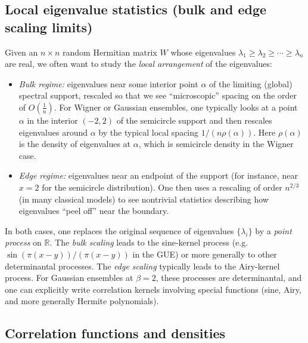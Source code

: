 \documentclass[letterpaper,11pt,oneside,reqno]{article}
\numberwithin{equation}{section}
\theoremstyle{definition}
\begin{document}
\subsection{Local eigenvalue statistics (bulk and edge scaling limits)}
\label{subsec:local-stats-intro}

Given an \(n\times n\) random Hermitian matrix \(W\) whose eigenvalues
\(\lambda_1 \ge \lambda_2 \ge \cdots \ge \lambda_n\) are real,
we often want to study the \emph{local arrangement} of the eigenvalues:
\begin{itemize}
	\item \emph{Bulk regime:}
		eigenvalues near some interior point \(\alpha\)
		of the limiting (global) spectral support, rescaled so that we see
		``microscopic'' spacing on the order of \(O(\tfrac1n)\).
		For Wigner or Gaussian ensembles, one typically looks at a point
		\(\alpha\) in the interior \((-2,2)\) of the semicircle support
		and then rescales eigenvalues around \(\alpha\) by the typical local spacing \(1/(n\rho(\alpha))\). Here $\rho(\alpha)$ is the density of eigenvalues at \(\alpha\),
		which is semicircle density in the Wigner case.
	\item \emph{Edge regime:}
		eigenvalues near an endpoint of the support
		(for instance, near \(x=2\) for the semicircle distribution).
		One then uses a rescaling of order \(n^{2/3}\) (in many classical models)
		to see nontrivial statistics describing how eigenvalues ``peel off'' near the boundary.
\end{itemize}

In both cases, one replaces the original sequence of eigenvalues \(\{\lambda_i\}\) by
a \emph{point process} on \(\mathbb{R}\).  The \emph{bulk scaling} leads to the sine-kernel process (e.g.\ \(\sin(\pi(x-y))/(\pi(x-y))\) in the GUE) or more generally to other determinantal processes.
The \emph{edge scaling} typically leads to the Airy-kernel process.
For Gaussian ensembles at \(\beta=2\), these processes are determinantal, and one can explicitly
write correlation kernels involving special functions (sine, Airy, and more generally Hermite polynomials).

\subsection{Correlation functions and densities}
\label{subsec:correlation-functions}
\end{document}
